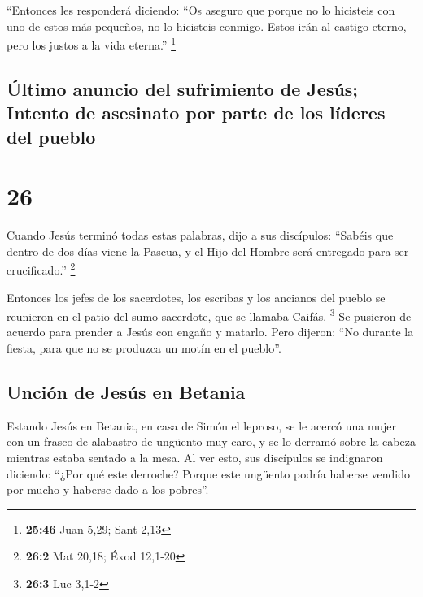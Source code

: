  ``Entonces les responderá diciendo: ``Os aseguro que
porque no lo hicisteis con uno de estos más pequeños, no lo hicisteis
conmigo.  Estos irán al castigo eterno, pero los justos a
la vida eterna.'' \footnote{\textbf{25:46} Juan 5,29; Sant 2,13}

\hypertarget{uxfaltimo-anuncio-del-sufrimiento-de-jesuxfas-intento-de-asesinato-por-parte-de-los-luxedderes-del-pueblo}{%
\subsection{Último anuncio del sufrimiento de Jesús; Intento de
asesinato por parte de los líderes del
pueblo}\label{uxfaltimo-anuncio-del-sufrimiento-de-jesuxfas-intento-de-asesinato-por-parte-de-los-luxedderes-del-pueblo}}

\hypertarget{section-25}{%
\section{26}\label{section-25}}

 Cuando Jesús terminó todas estas palabras, dijo a sus
discípulos:  ``Sabéis que dentro de dos días viene la
Pascua, y el Hijo del Hombre será entregado para ser crucificado.''
\footnote{\textbf{26:2} Mat 20,18; Éxod 12,1-20}

 Entonces los jefes de los sacerdotes, los escribas y los
ancianos del pueblo se reunieron en el patio del sumo sacerdote, que se
llamaba Caifás. \footnote{\textbf{26:3} Luc 3,1-2}  Se
pusieron de acuerdo para prender a Jesús con engaño y matarlo.
 Pero dijeron: ``No durante la fiesta, para que no se
produzca un motín en el pueblo''.

\hypertarget{unciuxf3n-de-jesuxfas-en-betania}{%
\subsection{Unción de Jesús en
Betania}\label{unciuxf3n-de-jesuxfas-en-betania}}

 Estando Jesús en Betania, en casa de Simón el leproso,
 se le acercó una mujer con un frasco de alabastro de
ungüento muy caro, y se lo derramó sobre la cabeza mientras estaba
sentado a la mesa.  Al ver esto, sus discípulos se
indignaron diciendo: ``¿Por qué este derroche?  Porque
este ungüento podría haberse vendido por mucho y haberse dado a los
pobres''.

